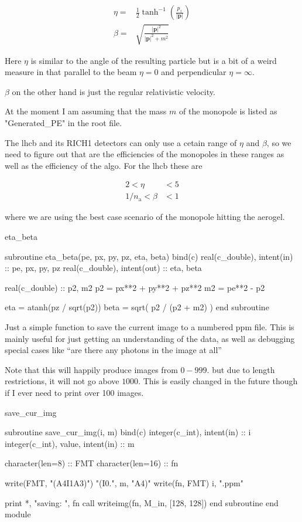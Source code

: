 \documentclass[10pt, a4paper]{article}
\begin{document}
\begin{align}
\eta =& \frac{1}{2} \tanh^{-1}\left( \frac{p_z}{\lvert \mathbf{p}\rvert} \right) \\
\beta =& \sqrt{\frac{\lvert \mathbf{p}\rvert ^2}{\lvert \mathbf{p}\rvert^2 + m^2}}
\end{align}

Here $\eta$ is similar to the angle of the resulting particle but is a bit of a weird measure in that parallel to the beam $\eta =0$ and perpendicular $\eta=\infty$. 

$\beta$ on the other hand is just the regular relativistic velocity.

At the moment I am assuming that the mass $m$ of the monopole is listed as "Generated_PE" in the root file. 

The lhcb and its RICH1 detectors can only use a cetain range of $\eta$ and $\beta$, so we need to figure out that are the efficiencies of the monopoles in these ranges as well as the efficiency of the algo. For the lhcb these are

\begin{align}
 2 < \eta& < 5\\
 1/n_\text{a} < \beta& < 1
\end{align}

where we are using the best case scenario of the monopole hitting the aerogel. 

\begin{codeblock}{eta_beta}
\begin{code}
subroutine eta_beta(pe, px, py, pz, eta, beta) bind(c)
	real(c_double), intent(in)  :: pe, px, py, pz
	real(c_double), intent(out) :: eta, beta
	
	real(c_double) :: p2, m2
	p2 = px**2 + py**2 + pz**2
	m2 = pe**2 - p2
	
	eta =  atanh(pz / sqrt(p2))
	beta = sqrt( p2 / (p2 + m2) )
end subroutine
\end{code}
\end{codeblock}

Just a simple function to save the current image to a numbered ppm file. This is mainly useful for just getting an understanding of the data, as well as debugging special cases like ``are there any photons in the image at all''

Note that this will happily produce images from $0-999$. but due to length restrictions, it will not go above $1000$. This is easily changed in the future though if I ever need to print over 100 images.

\begin{codeblock}{save_cur_img}
\begin{code}
subroutine save_cur_img(i, m) bind(c)
	integer(c_int), intent(in) :: i
	integer(c_int), value, intent(in) :: m 
	
	character(len=8) :: FMT
	character(len=16) :: fn
	
	write(FMT, "(A4I1A3)") "(I0.", m, "A4)"
	write(fn, FMT) i, ".ppm"
	
	print *, "saving: ", fn 
	call writeimg(fn, M_in, [128, 128])
end subroutine
end module
\end{code}
\end{codeblock}

\printindex
\end{document}
